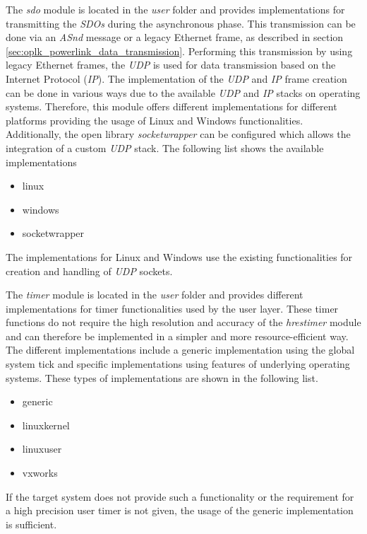 \begin{description}[leftmargin=1cm]
    \item[sdo] The \emph{sdo} module is located in the \emph{user} folder and provides implementations for transmitting the \emph{SDOs} during the asynchronous phase.
    This transmission can be done via an \emph{ASnd} message or a legacy Ethernet frame, as described in section \ref{sec:oplk_powerlink_data_transmission}.
    Performing this transmission by using legacy Ethernet frames, the \emph{UDP} is used for data transmission based on the Internet Protocol (\emph{IP}).
    The implementation of the \emph{UDP} and \emph{IP} frame creation can be done in various ways due to the available \emph{UDP} and \emph{IP} stacks on operating systems.
    Therefore, this module offers different implementations for different platforms providing the usage of Linux and Windows functionalities.
    Additionally, the open library \emph{socketwrapper} can be configured which allows the integration of a custom \emph{UDP} stack.
    The following list shows the available implementations
    \begin{multicols}{3}
        \begin{itemize}
            \item linux
            \item windows
            \item socketwrapper
        \end{itemize}
    \end{multicols}
    The implementations for Linux and Windows use the existing functionalities for creation and handling of \emph{UDP} sockets.\\
    
    
    \item[timer] The \emph{timer} module is located in the \emph{user} folder and provides different implementations for timer functionalities used by the user layer.
    These timer functions do not require the high resolution and accuracy of the \emph{hrestimer} module and can therefore be implemented in a simpler and more resource-efficient way.
    The different implementations include a generic implementation using the global system tick and specific implementations using features of underlying operating systems.
    These types of implementations are shown in the following list.
    \begin{multicols}{3}
        \begin{itemize}
            \item generic
            \item linuxkernel
            \item linuxuser
            \item vxworks
        \end{itemize}
    \end{multicols}
    If the target system does not provide such a functionality or the requirement for a high precision user timer is not given, the usage of the generic implementation is sufficient.\\
    

\end{description}

